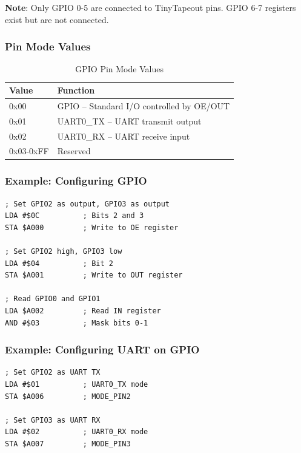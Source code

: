 \documentclass[11pt,a4paper]{article}
\begin{document}
\textbf{Note}: Only GPIO 0-5 are connected to TinyTapeout pins. GPIO 6-7 registers exist but are not connected.

\subsubsection{Pin Mode Values}

\begin{table}[H]
\centering
\begin{tabular}{ll}
\toprule
\textbf{Value} & \textbf{Function} \\
\midrule
0x00 & GPIO -- Standard I/O controlled by OE/OUT \\
0x01 & UART0\_TX -- UART transmit output \\
0x02 & UART0\_RX -- UART receive input \\
0x03-0xFF & Reserved \\
\bottomrule
\end{tabular}
\caption{GPIO Pin Mode Values}
\end{table}

\subsubsection{Example: Configuring GPIO}

\begin{lstlisting}[language=asm6502, caption=Configure GPIO pins]
; Set GPIO2 as output, GPIO3 as output
LDA #$0C          ; Bits 2 and 3
STA $A000         ; Write to OE register

; Set GPIO2 high, GPIO3 low
LDA #$04          ; Bit 2
STA $A001         ; Write to OUT register

; Read GPIO0 and GPIO1
LDA $A002         ; Read IN register
AND #$03          ; Mask bits 0-1
\end{lstlisting}

\subsubsection{Example: Configuring UART on GPIO}

\begin{lstlisting}[language=asm6502, caption=Configure UART TX on GPIO2 and RX on GPIO3]
; Set GPIO2 as UART TX
LDA #$01          ; UART0_TX mode
STA $A006         ; MODE_PIN2

; Set GPIO3 as UART RX
LDA #$02          ; UART0_RX mode
STA $A007         ; MODE_PIN3
\end{lstlisting}
\end{document}
